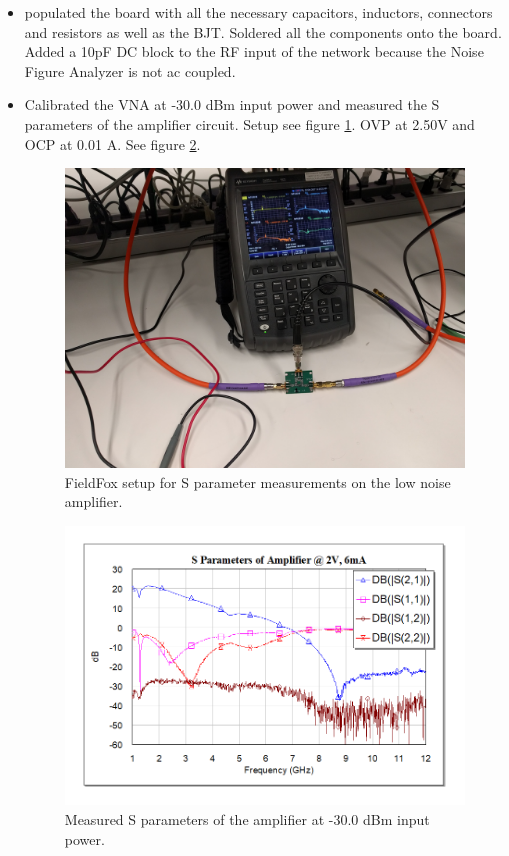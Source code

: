\documentclass[twocolumn, aps, apl]{revtex4-1}
\begin{document}
\begin{itemize}
    \item populated the board with all the necessary capacitors, inductors, connectors and resistors as well as the BJT. Soldered all the components onto the board. Added a 10pF DC block to the RF input of the network because the Noise Figure Analyzer is not ac coupled. 

    \item Calibrated the VNA at -30.0 dBm input power and measured the S parameters of the amplifier circuit. Setup see figure \ref{fig:ampimg}. OVP at 2.50V and OCP at 0.01 A. See figure \ref{fig:ampSparams}.

    \begin{figure}[!htbp]
    \centering
    \includegraphics[scale=0.05]{LNA_1.jpg}
    \caption{FieldFox setup for S parameter measurements on the low noise amplifier.}
    \label{fig:ampimg}
    \end{figure}

    \begin{figure}[!htbp]
    \centering
    \includegraphics[scale=0.3]{amp_S_params.png}
    \caption{Measured S parameters of the amplifier at -30.0 dBm input power.}
    \label{fig:ampSparams}
    \end{figure}


\end{itemize}
\end{document}
